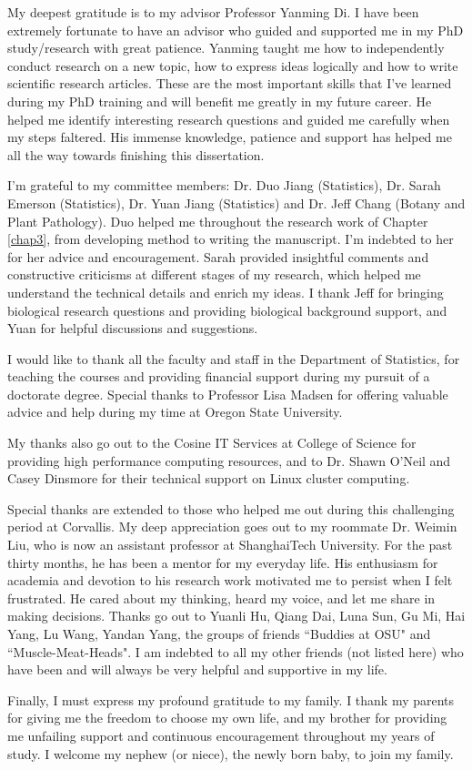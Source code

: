 
My deepest gratitude is to my advisor Professor Yanming Di. I have been extremely fortunate to have 
an advisor 
who guided and supported me in my PhD study/research with great patience. Yanming taught me how to 
independently conduct research on a new topic, how to express ideas logically and how to write 
scientific research articles. These are the most important skills that I've learned during my PhD 
training and will benefit me greatly in my future career. He helped me identify interesting 
research questions and guided me carefully when my steps faltered. His immense knowledge, patience 
and support has helped me all the way towards finishing this dissertation.

I'm grateful to my committee members: Dr. Duo Jiang (Statistics), Dr. Sarah Emerson (Statistics), 
Dr. Yuan Jiang (Statistics) and Dr. Jeff Chang (Botany and Plant Pathology). Duo helped me 
throughout the research work of Chapter \ref{chap3}, from developing 
method to writing the manuscript. I'm indebted to her for her advice and encouragement. Sarah 
provided 
insightful comments and constructive criticisms at different stages of my research, which helped me 
understand the technical details and enrich my ideas. I thank Jeff for bringing biological research 
questions and providing biological background support, and Yuan for helpful discussions and 
suggestions. 

I would like to thank all the faculty and staff in the Department of Statistics, for teaching 
the courses and providing financial support during my pursuit of a doctorate degree. Special 
thanks to Professor Lisa Madsen for offering valuable advice and help during my time at Oregon 
State University. 

My thanks also go out to the Cosine IT Services at College of Science for providing high 
performance computing resources, and to Dr. Shawn O'Neil and Casey Dinsmore for their technical 
support on Linux cluster computing. 

Special thanks are extended to those who helped me out during this challenging period at Corvallis. 
My deep appreciation goes out to my roommate Dr. Weimin Liu, who is now an assistant professor at 
ShanghaiTech University. For the past thirty months, he has been a mentor for my everyday life. His 
enthusiasm for academia and devotion to his research work motivated me to persist when I felt 
frustrated. He cared about my thinking, heard my voice, and let me share in making decisions. 
Thanks go out to Yuanli Hu, Qiang Dai, Luna Sun, Gu Mi, Hai Yang, Lu Wang, Yandan Yang, the groups 
of friends ``Buddies at OSU" and ``Muscle-Meat-Heads". I am indebted to all my other friends (not 
listed here) who have been and will always be very helpful and supportive in my life.


Finally, I must express my profound gratitude to my family. I thank my parents for giving me the 
freedom to choose my own life, and my brother for providing me unfailing support and continuous 
encouragement throughout my years of study. I welcome my nephew (or niece), the newly born baby, to 
join my family.



